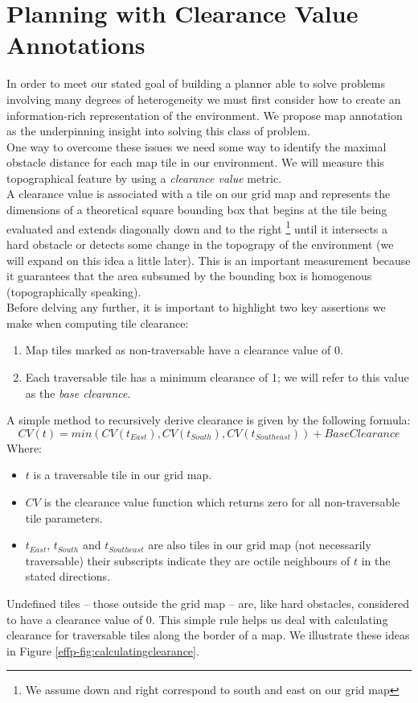 \section{Planning with Clearance Value Annotations}
\label{aha:annotations}
In order to meet our stated goal of building a planner able to solve problems involving many degrees of heterogeneity we must first consider how to create an information-rich representation of the environment. We propose map annotation as the underpinning insight into solving this class of problem. \\ \newline
One way to overcome these issues  we need some way to identify the maximal obstacle distance for each map tile in our environment. We will measure this topographical feature by using a \emph{clearance value} metric. \\ \newline
A clearance value is associated with a tile on our grid map and represents the dimensions of a theoretical square bounding box that begins at the tile being evaluated and extends diagonally down and to the right \footnote{We assume down and right correspond to south and east on our grid map} until it intersects a hard obstacle or detects some change in the topograpy of the environment (we will expand on this idea a little later). This is an important measurement because it guarantees that the area subsumed by the bounding box is homogenous (topographically speaking). \\ \newline
Before delving any further, it is important to highlight two key assertions we make when computing tile clearance:
\begin{enumerate}
\item{Map tiles marked as non-traversable have a clearance value of 0.}
\item{Each traversable tile has a minimum clearance of 1; we will refer to this value as the \emph{base clearance}}.
\end{enumerate}
A simple method to recursively derive clearance is given by the following formula:
\begin{equation}
CV(t) = min(CV(t_{East}), CV(t_{South}), CV(t_{Southeast}))+BaseClearance
\end{equation}
Where:
\begin{itemize}
\item{$t$ is a traversable tile in our grid map.}
\item{$CV$ is the clearance value function which returns zero for all non-traversable tile parameters.}
\item{ $t_{East}$, $t_{South}$ and $t_{Southeast}$ are also tiles in our grid map (not necessarily traversable)\; their  subscripts indicate they are octile neighbours of $t$ in the stated directions.}
\end{itemize}
Undefined tiles -- those outside the grid map -- are, like hard obstacles, considered to have a clearance value of 0. This simple rule helps us deal with calculating clearance for traversable tiles along the border of a map. We illustrate these ideas in Figure \ref{effp-fig:calculatingclearance}.


